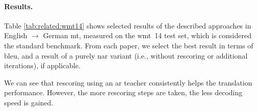 
\paragraph{Results.} Table \ref{tab:related:wmt14} shows selected results of
the described approaches in English $\rightarrow$ German \ac{mt}, measured on
the \acs{wmt}~14 test set, which is considered the standard benchmark. From
each paper, we select the best result in terms of \acs{bleu}, and a result of a
purely \acl{nar} variant (i.e., without rescoring or additional iterations), if
applicable.

We can see that rescoring using an \acl{ar} teacher consistently helps the
translation performance. However, the more rescoring steps are taken, the less
decoding speed is gained. 

